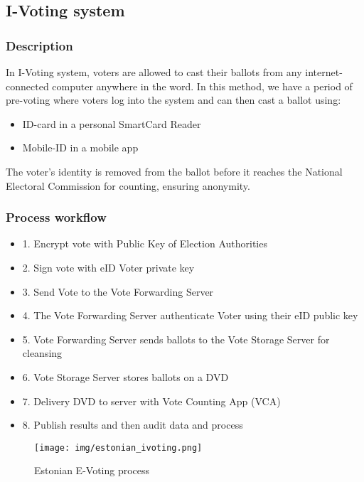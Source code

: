 \subsection{I-Voting system}

\subsubsection{Description}

In I-Voting system, voters are allowed to cast their ballots from any internet-connected computer anywhere in the word. In this method, we have a period of pre-voting where voters log into the system and can then cast a ballot using:
\begin{itemize}
    \item ID-card in a personal SmartCard Reader
    \item Mobile-ID in a mobile app
\end{itemize}

The voter's identity is removed from the ballot before it reaches the National Electoral Commission for counting, ensuring anonymity. 

\subsubsection{Process workflow}

\begin{itemize}
    \item 1. Encrypt vote with Public Key of Election Authorities
    \item 2. Sign vote with eID Voter private key
    \item 3. Send Vote to the Vote Forwarding Server
    \item 4. The Vote Forwarding Server authenticate Voter using their eID public key
    \item 5. Vote Forwarding Server sends ballots to the Vote Storage Server for cleansing
    \item 6. Vote Storage Server stores ballots on a DVD
    \item 7. Delivery DVD to server with Vote Counting App (VCA)
    \item 8. Publish results and then audit data and process
\end{itemize}

\begin{figure}
    \centering
    \texttt{[image: img/estonian\_ivoting.png]}
    \caption{Estonian E-Voting process}
    \label{fig:estonian_e-voting}
\end{figure}


